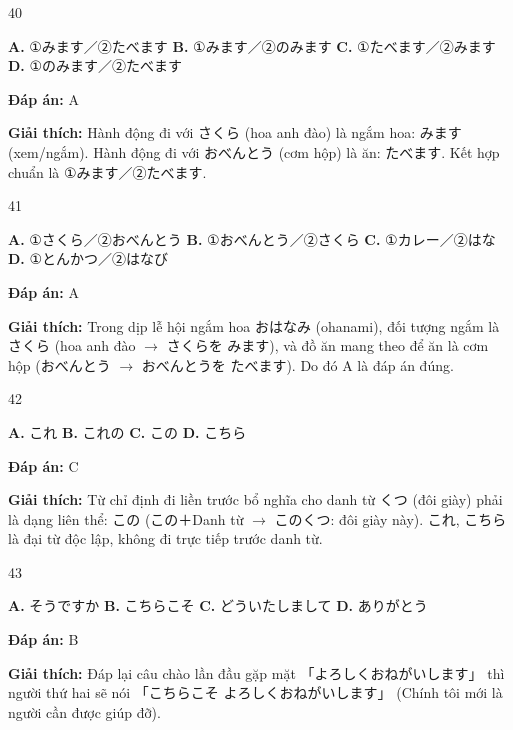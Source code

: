 \documentclass[12pt,a4paper]{report}
\newcommand{\source}[1]{}
\newcommand{\choice}[2]{\textbf{#1.} #2 \quad}
\newcommand{\answer}[1]{\par\textbf{Đáp án:} #1}
\newcommand{\confidence}[1]{}
\newcommand{\explain}[1]{\par\textbf{Giải thích:} #1\vspace{0.5cm}}
\begin{document}
\begin{question}{40}
\source{Q29.jpg}
\choice{A}{①みます／②たべます}
\choice{B}{①みます／②のみます}
\choice{C}{①たべます／②みます}
\choice{D}{①のみます／②たべます}
\answer{A}
\confidence{high}
\explain{Hành động đi với さくら (hoa anh đào) là ngắm hoa: みます (xem/ngắm). Hành động đi với おべんとう (cơm hộp) là ăn: たべます. Kết hợp chuẩn là ①みます／②たべます.}
\end{question}

\begin{question}{41}
\source{Q30.jpg}
\choice{A}{①さくら／②おべんとう}
\choice{B}{①おべんとう／②さくら}
\choice{C}{①カレー／②はな}
\choice{D}{①とんかつ／②はなび}
\answer{A}
\confidence{high}
\explain{Trong dịp lễ hội ngắm hoa おはなみ (ohanami), đối tượng ngắm là さくら (hoa anh đào $\rightarrow$ さくらを みます), và đồ ăn mang theo để ăn là cơm hộp (おべんとう $\rightarrow$ おべんとうを たべます). Do đó A là đáp án đúng.}
\end{question}

\begin{question}{42}
\source{Q8.webp}
\choice{A}{これ}
\choice{B}{これの}
\choice{C}{この}
\choice{D}{こちら}
\answer{C}
\confidence{high}
\explain{Từ chỉ định đi liền trước bổ nghĩa cho danh từ くつ (đôi giày) phải là dạng liên thể: この (この＋Danh từ $\rightarrow$ このくつ: đôi giày này). これ, こちら là đại từ độc lập, không đi trực tiếp trước danh từ.}
\end{question}

\begin{question}{43}
\source{Q12.webp}
\choice{A}{そうですか}
\choice{B}{こちらこそ}
\choice{C}{どういたしまして}
\choice{D}{ありがとう}
\answer{B}
\confidence{high}
\explain{Đáp lại câu chào lần đầu gặp mặt 「よろしくおねがいします」 thì người thứ hai sẽ nói 「こちらこそ よろしくおねがいします」 (Chính tôi mới là người cần được giúp đỡ).}
\end{question}
\end{document}
